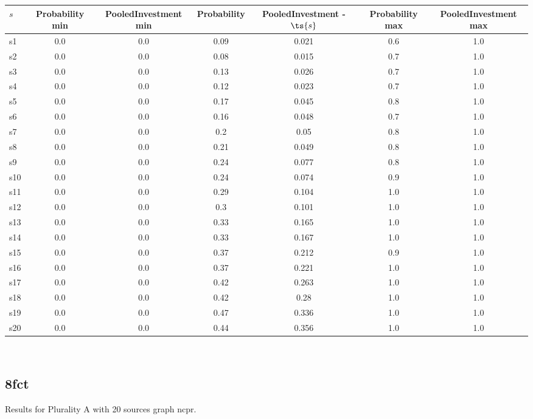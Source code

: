 \documentclass{article}
\begin{document}
\noindent\begin{tabular}{|l|c|c|c|c|c|c|}
\hline
$s$& Probability min & PooledInvestment min & Probability & PooledInvestment - $\ts{s}$ & Probability max & PooledInvestment max\\
\hline
s1 &0.0 & 0.0 & 0.09 & 0.021 & 0.6 & 1.0\\
\hline
s2 &0.0 & 0.0 & 0.08 & 0.015 & 0.7 & 1.0\\
\hline
s3 &0.0 & 0.0 & 0.13 & 0.026 & 0.7 & 1.0\\
\hline
s4 &0.0 & 0.0 & 0.12 & 0.023 & 0.7 & 1.0\\
\hline
s5 &0.0 & 0.0 & 0.17 & 0.045 & 0.8 & 1.0\\
\hline
s6 &0.0 & 0.0 & 0.16 & 0.048 & 0.7 & 1.0\\
\hline
s7 &0.0 & 0.0 & 0.2 & 0.05 & 0.8 & 1.0\\
\hline
s8 &0.0 & 0.0 & 0.21 & 0.049 & 0.8 & 1.0\\
\hline
s9 &0.0 & 0.0 & 0.24 & 0.077 & 0.8 & 1.0\\
\hline
s10 &0.0 & 0.0 & 0.24 & 0.074 & 0.9 & 1.0\\
\hline
s11 &0.0 & 0.0 & 0.29 & 0.104 & 1.0 & 1.0\\
\hline
s12 &0.0 & 0.0 & 0.3 & 0.101 & 1.0 & 1.0\\
\hline
s13 &0.0 & 0.0 & 0.33 & 0.165 & 1.0 & 1.0\\
\hline
s14 &0.0 & 0.0 & 0.33 & 0.167 & 1.0 & 1.0\\
\hline
s15 &0.0 & 0.0 & 0.37 & 0.212 & 0.9 & 1.0\\
\hline
s16 &0.0 & 0.0 & 0.37 & 0.221 & 1.0 & 1.0\\
\hline
s17 &0.0 & 0.0 & 0.42 & 0.263 & 1.0 & 1.0\\
\hline
s18 &0.0 & 0.0 & 0.42 & 0.28 & 1.0 & 1.0\\
\hline
s19 &0.0 & 0.0 & 0.47 & 0.336 & 1.0 & 1.0\\
\hline
s20 &0.0 & 0.0 & 0.44 & 0.356 & 1.0 & 1.0\\
\hline
\end{tabular}\\

\newpage

\subsection{8fct}

\noindent Results for Plurality A with 20 sources graph ncpr.
\end{document}
